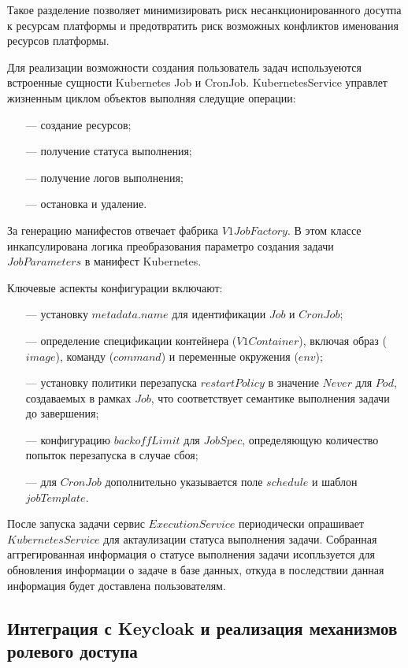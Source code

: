 Такое разделение позволяет минимизировать риск несанкционированного досутпа к ресурсам платформы и предотвратить риск возможных конфликтов именования ресурсов платформы.

Для реализации возможности создания пользователь задач используеются встроенные сущности Kubernetes Job и CronJob.
KubernetesService управлет жизненным циклом объектов выполняя следущие операции:

\begin{itemize}
\item[---] создание ресурсов;
\item[---] получение статуса выполнения;
\item[---] получение логов выполнения;
\item[---] остановка и удаление.
\end{itemize}

За генерацию манифестов отвечает фабрика\cite{cooper2000java} $V1JobFactory$. 
В этом классе инкапсулирована логика преобразования параметро создания задачи $JobParameters$ в манифест Kubernetes.

Ключевые аспекты конфигурации включают:

\begin{itemize}
\item[---] установку $metadata.name$ для идентификации $Job$ и $CronJob$;
\item[---] определение спецификации контейнера ($V1Container$), включая образ ($image$), команду ($command$) и переменные окружения ($env$);
\item[---] установку политики перезапуска $restartPolicy$ в значение $Never$ для $Pod$, создаваемых в рамках $Job$, что соответствует семантике выполнения задачи до завершения;
\item[---] конфигурацию $backoffLimit$ для $JobSpec$, определяющую количество попыток перезапуска в случае сбоя;
\item[---] для $CronJob$ дополнительно указывается поле $schedule$ и шаблон $jobTemplate$.
\end{itemize}

После запуска задачи сервис $ExecutionService$ периодически опрашивает $KubernetesService$ для актаулизации статуса выполнения задачи.
Собранная аггрегированная информация о статусе выполнения задачи исопльзуется для обновления информации о задаче в базе данных, откуда в последствии данная информация будет доставлена пользователям.

\subsection{Интеграция с Keycloak и реализация механизмов ролевого доступа}

